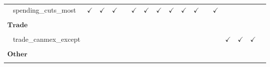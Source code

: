 \documentclass[
  12pt]{article}
\begin{document}
\begin{table}[H]
{\begin{tabular}{lcccccccccccccccc}
$\hspace{10pt}$spending\_cuts\_most & $\checkmark$ & $\checkmark$ & $\checkmark$ &  & $\checkmark$ & $\checkmark$ & $\checkmark$ & $\checkmark$ & $\checkmark$ & $\checkmark$ &  & $\checkmark$ &  &  &  & \\
\cellcolor{gray!6}{$\hspace{10pt}$spending\_cuts\_least} & \cellcolor{gray!6}{$\checkmark$} & \cellcolor{gray!6}{$\checkmark$} & \cellcolor{gray!6}{$\checkmark$} & \cellcolor{gray!6}{} & \cellcolor{gray!6}{$\checkmark$} & \cellcolor{gray!6}{$\checkmark$} & \cellcolor{gray!6}{$\checkmark$} & \cellcolor{gray!6}{$\checkmark$} & \cellcolor{gray!6}{$\checkmark$} & \cellcolor{gray!6}{$\checkmark$} & \cellcolor{gray!6}{} & \cellcolor{gray!6}{$\checkmark$} & \cellcolor{gray!6}{} & \cellcolor{gray!6}{} & \cellcolor{gray!6}{} & \cellcolor{gray!6}{}\\
$\textbf{Trade}$ &  &  &  &  &  &  &  &  &  &  &  &  &  &  &  & \\
\cellcolor{gray!6}{$\hspace{10pt}$trade\_china} & \cellcolor{gray!6}{} & \cellcolor{gray!6}{} & \cellcolor{gray!6}{} & \cellcolor{gray!6}{} & \cellcolor{gray!6}{} & \cellcolor{gray!6}{} & \cellcolor{gray!6}{} & \cellcolor{gray!6}{} & \cellcolor{gray!6}{} & \cellcolor{gray!6}{} & \cellcolor{gray!6}{} & \cellcolor{gray!6}{} & \cellcolor{gray!6}{$\checkmark$} & \cellcolor{gray!6}{$\checkmark$} & \cellcolor{gray!6}{$\checkmark$} & \cellcolor{gray!6}{$\checkmark$}\\
$\hspace{10pt}$trade\_canmex\_except &  &  &  &  &  &  &  &  &  &  &  &  & $\checkmark$ & $\checkmark$ & $\checkmark$ & \\
\cellcolor{gray!6}{$\hspace{10pt}$trade\_canmex\_include} & \cellcolor{gray!6}{} & \cellcolor{gray!6}{} & \cellcolor{gray!6}{} & \cellcolor{gray!6}{} & \cellcolor{gray!6}{} & \cellcolor{gray!6}{} & \cellcolor{gray!6}{} & \cellcolor{gray!6}{} & \cellcolor{gray!6}{} & \cellcolor{gray!6}{} & \cellcolor{gray!6}{} & \cellcolor{gray!6}{} & \cellcolor{gray!6}{$\checkmark$} & \cellcolor{gray!6}{$\checkmark$} & \cellcolor{gray!6}{$\checkmark$} & \cellcolor{gray!6}{$\checkmark$}\\
$\textbf{Other}$ &  &  &  &  &  &  &  &  &  &  &  &  &  &  &  & \\
\cellcolor{gray!6}{$\hspace{10pt}$gaymarriage\_scale} & \cellcolor{gray!6}{$\checkmark$} & \cellcolor{gray!6}{$\checkmark$} & \cellcolor{gray!6}{} & \cellcolor{gray!6}{} & \cellcolor{gray!6}{} & \cellcolor{gray!6}{} & \cellcolor{gray!6}{} & \cellcolor{gray!6}{} & \cellcolor{gray!6}{} & \cellcolor{gray!6}{} & \cellcolor{gray!6}{} & \cellcolor{gray!6}{} & \cellcolor{gray!6}{} & \cellcolor{gray!6}{} & \cellcolor{gray!6}{} & \cellcolor{gray!6}{}\\

\end{tabular}}
\end{table}
\end{document}
